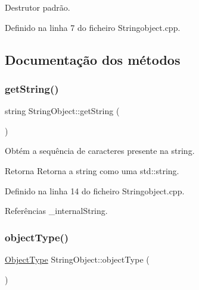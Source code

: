 Destrutor padrão. 



Definido na linha 7 do ficheiro Stringobject.\+cpp.



\subsection{Documentação dos métodos}
\mbox{\label{classStringObject_aedd2df1630c9b291ea17407b3f626573}} 
\subsubsection{\texorpdfstring{get\+String()}{getString()}}
{\footnotesize\ttfamily string String\+Object\+::get\+String (\begin{DoxyParamCaption}{ }\end{DoxyParamCaption})}



Obtém a sequência de caracteres presente na string. 

\begin{DoxyReturn}{Retorna}
Retorna a string como uma std\+::string. 
\end{DoxyReturn}


Definido na linha 14 do ficheiro Stringobject.\+cpp.



Referências \+\_\+internal\+String.

\mbox{\label{classStringObject_a7d89db7df43b17354baf5337edd636b7}} 
\subsubsection{\texorpdfstring{object\+Type()}{objectType()}}
{\footnotesize\ttfamily \hyperlink{BasicTypes_8h_a842c5e2e69277690b064bf363c017980}{Object\+Type} String\+Object\+::object\+Type (\begin{DoxyParamCaption}{ }\end{DoxyParamCaption})\hspace{0.3cm}{\ttfamily [virtual]}}



